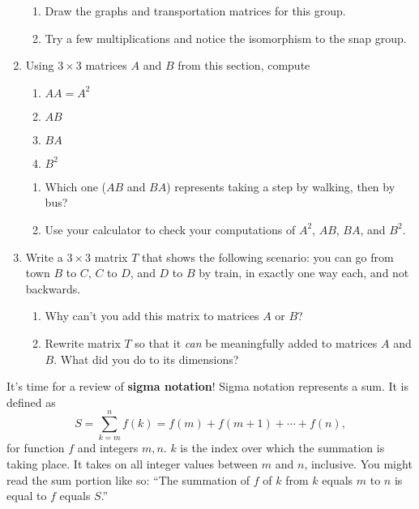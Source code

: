 \documentclass[../gatm.tex]{subfiles}
\begin{document}
\begin{enumerate}
\begin{enumerate}
\item Draw the graphs and transportation matrices for this group.
\item Try a few multiplications and notice the isomorphism to the snap group.
\end{enumerate}
\item Using $3\times 3$ matrices $A$ and $B$ from this section, compute
\begin{multicols}{4}
\begin{enumerate}
\item $AA=A^2$
\item $AB$
\item $BA$
\item $B^2$
\setcounter{mtrx_mult_problem_ii}{\value{enumii}}
\end{enumerate}
\end{multicols}
\begin{enumerate}
\setcounter{enumii}{\value{mtrx_mult_problem_ii}}
\item Which one ($AB$ and $BA$) represents taking a step by walking, then by bus?
\item Use your calculator to check your computations of $A^2$, $AB$, $BA$, and $B^2$.
\end{enumerate}
\item Write a $3\times 3$ matrix $T$ that shows the following scenario: you can go from town $B$ to $C$, $C$ to $D$, and $D$ to $B$ by train, in exactly one way each, and not backwards.
\begin{enumerate}
\item Why can't you add this matrix to matrices $A$ or $B$?
\item Rewrite matrix $T$ so that it \textit{can} be meaningfully added to matrices $A$ and $B$. What did you do to its dimensions?
\end{enumerate}
\setcounter{mtrx_mult_problem_i}{\value{enumi}}
\end{enumerate}

It's time for a review of \textbf{sigma notation}! Sigma notation represents a sum. It is defined as
$$S=\sum_{k=m}^{n} f(k)=f(m)+f(m+1)+\cdots + f(n),$$
for function $f$ and integers $m,n$. $k$ is the index over which the summation is taking place. It takes on all integer values between $m$ and $n$, inclusive. You might read the sum portion like so: ``The summation of $f$ of $k$ from $k$ equals $m$ to $n$ is equal to $f$ equals $S$.''
\end{document}
